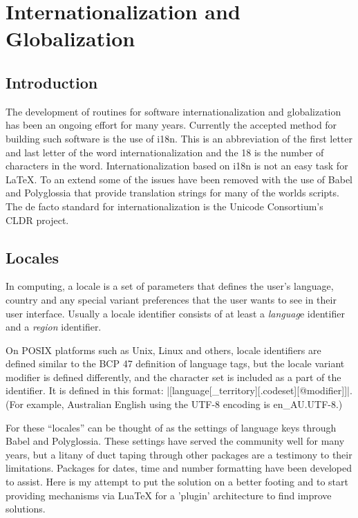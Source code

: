 \chapter{Internationalization and Globalization}

\section{Introduction}

The development of routines for software internationalization and globalization has been an ongoing effort for many years. Currently the accepted method for building such software is the use of i18n. This is an abbreviation of the first letter and last letter of the word internationalization and the 18 is the number of characters in the word.
Internationalization based on i18n is not an easy task for LaTeX. To an extend some of the issues have been removed with the use of Babel and Polyglossia that provide translation strings for many of the worlds scripts. The de facto standard for internationalization is the Unicode Consortium’s CLDR project.

\section{Locales}

In computing, a locale is a set of parameters that defines the user's language, country and any special variant preferences that the user wants to see in their user interface. Usually a locale identifier consists of at least a \textit{languag}e identifier and a \textit{region} identifier.

On POSIX platforms such as Unix, Linux and others, locale identifiers are defined similar to the BCP 47 definition of language tags, but the locale variant modifier is defined differently, and the character set is included as a part of the identifier. It is defined in this format: |[language[_territory][.codeset][@modifier]]|. (For example, Australian English using the UTF-8 encoding is en\_AU.UTF-8.)

For \latex these ``locales'' can be thought of as the settings of language keys through Babel and Polyglossia. These settings have served the community well for many years, but a litany of duct taping through other packages are a testimony to their limitations. Packages for dates, time and number formatting have been developed to assist. Here is my attempt to put the solution on a better footing and to start providing mechanisms via LuaTeX for a 'plugin'
architecture to find improve solutions. 

